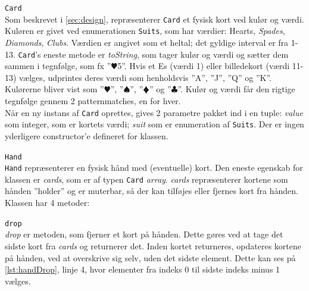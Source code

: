 \documentclass[a4paper]{article}
\newcommand{\namedref}[1]{\autoref{#1}} %
\begin{document}
      \begin{description}
        \item{\texttt{\texttt{Card}}}~\\
          Som beskrevet i \namedref{sec:design}, repræsenterer \texttt{Card} et fysisk kort ved 
          kulør og værdi. Kuløren er givet ved enumerationen \texttt{Suits}, som har værdier: 
          Hearts, \textit{Spades}, \textit{Diamonds}, \textit{Clubs}. Værdien er angivet som 
          et heltal; det gyldige interval er fra 1-13.
          \texttt{Card}'s eneste metode er \textit{toString}, som tager kulør og værdi og sætter 
          dem sammen i tegnfølge, som fx ”$\varheartsuit$5”. Hvis et Es (værdi 1) eller billedekort 
          (værdi 11-13) vælges, udprintes deres værdi som henholdsvis ”A”, ”J”, ”Q” og ”K”.
          Kulørerne bliver vist som ”$\varheartsuit$”, ”$\spadesuit$”, ”$\vardiamondsuit$” og ”$\clubsuit$”. Kulør og værdi får den rigtige tegnfølge gennem 2 patternmatches, en for hver.\\
          Når en ny instans af \texttt{Card} oprettes, gives 2 parametre pakket ind i en tuple: \textit{value} som integer, som er kortets værdi; \textit{suit} som er enumeration af \texttt{Suits}.
          Der er ingen yderligere constructor'e defineret for klassen.
          
        \item{\texttt{\texttt{Hand}}}~\\
        \texttt{Hand} repræsenterer en fysisk hånd med (eventuelle) kort. Den eneste egenskab for 
        klassen er \textit{cards}, som er af typen \texttt{Card} \textit{array}. \textit{cards} 
        repræsenterer kortene som hånden ”holder” og er muterbar, så der kan tilføjes eller fjernes 
        kort fra hånden.\\
        Klassen har 4 metoder:
        \begin{description}
          \item{{\texttt{drop}}}~\\
            \textit{drop} er metoden, som fjerner et kort på hånden. Dette gøres ved at tage det sidste 
            kort fra \textit{cards} og returnerer det. Inden kortet returneres, opdateres kortene på 
            hånden, ved at overskrive sig selv, uden det sidste element. Dette kan ses på 
            \namedref{lst:handDrop}, linje 4, hvor elementer fra indeks 0 til sidste indeks minus 1 vælges.
            
            
            

\end{description}
\end{description}
\end{document}
